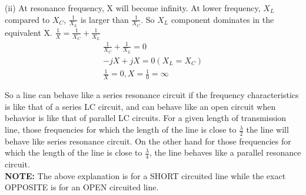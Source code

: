 (ii) At resonance frequency, X will become infinity. At lower frequency, $ X_{L} $ compared to $ X_{C} $, $ \frac{1}{X_{L}} $ is larger than $ \frac{1}{X_{C}} $. So $ X_{L} $ component dominates in the equivalent X. $ \frac{1}{X} = \frac{1}{X_{C}} + \frac{1}{X_{L}}$
\begin{align*}
\frac{1}{X_{C}} + \frac{1}{X_{L}} = 0\\
-jX + jX = 0 (X_{L} = X_{C})\\
\frac{1}{X} = 0, X = \frac{1}{0} = \infty
\end{align*}

So a line can behave like a series resonance circuit  if the frequency characteristics is like that of a series LC circuit, and can behave like an open circuit when behavior is like that of parallel LC circuits.
For a given length of transmission line, those frequencies for which the length of the line is close to $ \frac{\lambda}{2} $ the line will behave like series resonance circuit. On the other hand for those frequencies for which the length of the line is close to $ \frac{\lambda}{4} $, the line behaves like a parallel resonance circuit.\\
\textbf{NOTE:} The above explanation is for a SHORT circuited line while the exact OPPOSITE is for an OPEN circuited line.\\


